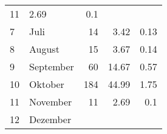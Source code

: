 \begin{longtable}{lXrrr}
       \num{11} &
       \num[round-mode=places,round-precision=2]{2.69} &
         \num[round-mode=places,round-precision=2]{0.1} \\

     7 &
     \multicolumn{1}{X}{ Juli   } &


       \num{14} &
       \num[round-mode=places,round-precision=2]{3.42} &
         \num[round-mode=places,round-precision=2]{0.13} \\

     8 &
     \multicolumn{1}{X}{ August   } &


       \num{15} &
       \num[round-mode=places,round-precision=2]{3.67} &
         \num[round-mode=places,round-precision=2]{0.14} \\

     9 &
     \multicolumn{1}{X}{ September   } &


       \num{60} &
       \num[round-mode=places,round-precision=2]{14.67} &
         \num[round-mode=places,round-precision=2]{0.57} \\

     10 &
     \multicolumn{1}{X}{ Oktober   } &


       \num{184} &
       \num[round-mode=places,round-precision=2]{44.99} &
         \num[round-mode=places,round-precision=2]{1.75} \\

     11 &
     \multicolumn{1}{X}{ November   } &


       \num{11} &
       \num[round-mode=places,round-precision=2]{2.69} &
         \num[round-mode=places,round-precision=2]{0.1} \\

     12 &
     \multicolumn{1}{X}{ Dezember   } &



\end{longtable}
